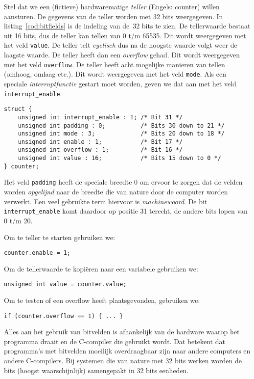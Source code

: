 Stel dat we een (fictieve) hardwarematige \textsl{teller} (Engels: counter) willen aansturen. De gegevens van de teller worden met 32 bits weergegeven. In listing~\ref{cod:bitfields} is de indeling van de~32 bits te zien. De tellerwaarde bestaat uit 16 bits, dus de teller kan tellen van 0 t/m 65535. Dit wordt weergegeven met het veld \texttt{value}. De teller telt \textsl{cyclisch} dus na de hoogste waarde volgt weer de laagste waarde. De teller heeft dan een \textsl{overflow} gehad. Dit wordt weergegeven met het veld \texttt{overflow}. De teller heeft acht mogelijke manieren van tellen (omhoog, omlaag etc.). Dit wordt weergegeven met het veld \texttt{mode}. Als een speciale \textsl{interruptfunctie} gestart moet worden, geven we dat aan met het veld \texttt{interrupt\_enable}.

\begin{lstlisting}[caption=Voorbeeld van bitvelden.,label=cod:bitfields]
struct {
    unsigned int interrupt_enable : 1; /* Bit 31 */
    unsigned int padding : 0;          /* Bits 30 down to 21 */
    unsigned int mode : 3;             /* Bits 20 down to 18 */
    unsigned int enable : 1;           /* Bit 17 */
    unsigned int overflow : 1;         /* Bit 16 */
    unsigned int value : 16;           /* Bits 15 down to 0 */
} counter;

\end{lstlisting}

Het veld \texttt{padding} heeft de speciale breedte 0 om ervoor te zorgen dat de velden worden \textsl{opgelijnd} naar de breedte die van nature door de computer worden verwerkt. Een veel gebruikte term hiervoor is \textsl{machinewoord}. De bit \texttt{interrupt\_enable} komt daardoor op positie 31 terecht, de andere bits lopen van 0 t/m 20.


Om te teller te starten gebruiken we:

\hspace*{1em}\texttt{counter.enable = 1;}

Om de tellerwaarde te kopiëren naar een variabele gebruiken we:

\hspace*{1em}\texttt{unsigned int value = counter.value;}

Om te testen of een overflow heeft plaatsgevonden, gebruiken we:

\hspace*{1em}\texttt{if (counter.overflow == 1) \{ ... \} }

Alles aan het gebruik van bitvelden is afhankelijk van de hardware waarop het programma draait en de C-compiler die gebruikt wordt. Dat betekent dat programma's met bitvelden moeilijk overdraagbaar zijn naar andere computers en andere C-compilers. Bij systemen die van nature met 32 bits werken worden de bits (hoogst waarschijnlijk) samengepakt in 32 bits eenheden.

